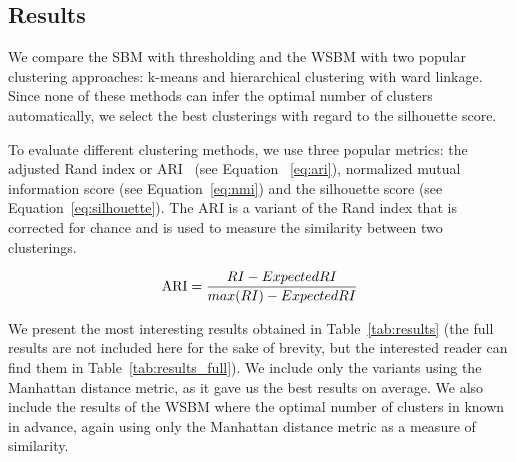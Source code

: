 \documentclass[conference]{IEEEtran}
\begin{document}
\subsection{Results}

We compare the SBM with thresholding and the WSBM with two popular clustering approaches: k-means and hierarchical clustering with ward linkage. Since none of these methods can infer the optimal number of clusters automatically, we select the best clusterings with regard to the silhouette score.

To evaluate different clustering methods, we use three popular metrics: the adjusted Rand index or ARI~\cite{hubert1985comparing} (see Equation ~\ref{eq:ari}), normalized mutual information score (see Equation~\ref{eq:nmi}) and the silhouette score (see Equation~\ref{eq:silhouette}). The ARI is a variant of the Rand index that is corrected for chance and is used to measure the similarity between two clusterings.

\begin{equation}\label{eq:ari}
\textnormal{ARI} = \frac{RI - ExpectedRI}{max(RI) - ExpectedRI}
\end{equation}

We present the most interesting results obtained in Table~\ref{tab:results} (the full results are not included here for the sake of brevity, but the interested reader can find them in Table~\ref{tab:results_full}). We include only the variants using the Manhattan distance metric, as it gave us the best results on average. We also include the results of the WSBM where the optimal number of clusters in known in advance, again using only the Manhattan distance metric as a measure of similarity.
\end{document}
